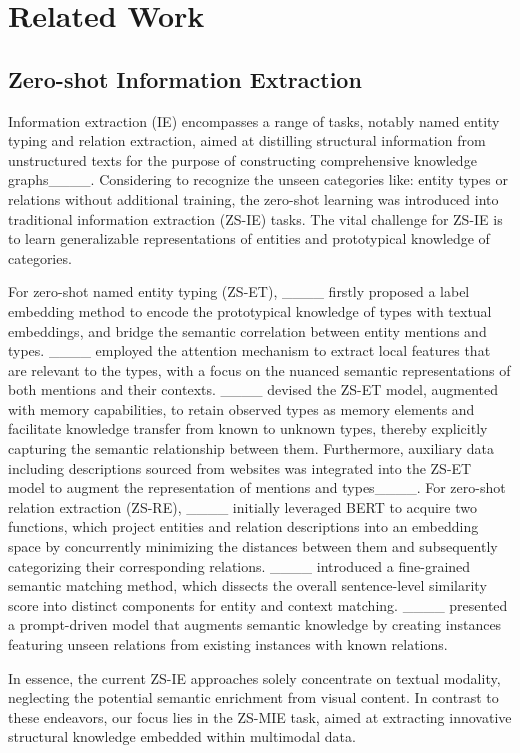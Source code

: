 \section{Related Work}
\subsection{Zero-shot Information Extraction}
%
Information extraction (IE) encompasses a range of tasks, notably named entity
typing and relation extraction, aimed at distilling structural information from
unstructured texts for the purpose of constructing comprehensive knowledge
graphs____.
%
Considering to recognize the unseen categories like: entity types or relations
without additional training, the zero-shot learning was introduced into
traditional information extraction (ZS-IE) tasks.
%
The vital challenge for ZS-IE is to learn generalizable representations of
entities and prototypical knowledge of categories.

For zero-shot named entity typing (ZS-ET), ____
firstly proposed a label embedding method to encode the prototypical knowledge
of types with textual embeddings, and bridge the semantic correlation between
entity mentions and types.
%
____ employed the attention mechanism to extract local
features that are relevant to the types, with a focus on the nuanced semantic
representations of both mentions and their contexts.
%
____ devised the ZS-ET model, augmented with
memory capabilities, to retain observed types as memory elements and facilitate
knowledge transfer from known to unknown types, thereby explicitly capturing the
semantic relationship between them.
%
Furthermore, auxiliary data including descriptions sourced from websites was
integrated into the ZS-ET model to augment the representation of mentions and
types____.
%
For zero-shot relation extraction (ZS-RE), ____ initially
leveraged BERT to acquire two functions, which project entities and relation
descriptions into an embedding space by concurrently minimizing the distances
between them and subsequently categorizing their corresponding relations.
%
____ introduced a fine-grained semantic matching
method, which dissects the overall sentence-level similarity score into distinct
components for entity and context matching.
%
____ presented a prompt-driven model that augments
semantic knowledge by creating instances featuring unseen relations from
existing instances with known relations.

In essence, the current ZS-IE approaches solely concentrate on textual modality,
neglecting the potential semantic enrichment from visual content. In contrast to
these endeavors, our focus lies in the ZS-MIE task, aimed at extracting
innovative structural knowledge embedded within multimodal data.

